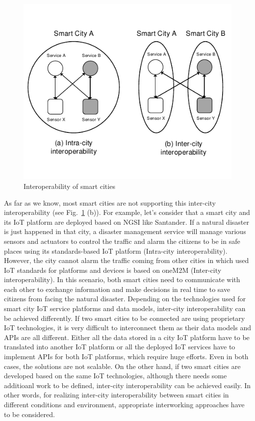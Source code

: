 \begin{figure}[H] %
\centering
\includegraphics[width=\textwidth]{figures/fig_interoperabilities_of_smart_cities.pdf}
\caption{Interoperability of smart cities}
\label{fig:definition_of_smartcity_interop}
\end{figure}

As far as we know, most smart cities are not supporting this inter-city interoperability (see Fig.~\ref{fig:definition_of_smartcity_interop} (b)). For example, let’s consider that a smart city and its IoT platform are deployed based on NGSI like Santander. If a natural disaster is just happened in that city, a disaster management service will manage various sensors and actuators to control the traffic and alarm the citizens to be in safe places using its standards-based IoT platform (Intra-city interoperability). However, the city cannot alarm the traffic coming from other cities in which used IoT standards for platforms and devices is based on oneM2M (Inter-city interoperability). In this scenario, both smart cities need to communicate with each other to exchange information and make decisions in real time to save citizens from facing the natural disaster. Depending on the technologies used for smart city IoT service platforms and data models, inter-city interoperability can be achieved differently. If two smart cities to be connected are using proprietary IoT technologies, it is very difficult to interconnect them as their data models and APIs are all different. Either all the data stored in a city IoT platform
have to be translated into another IoT platform or all the deployed IoT services have to implement APIs for both IoT
platforms, which require huge efforts. Even in both cases, the solutions are not scalable. On the other hand, if two smart cities are developed based on the same IoT technologies, although there needs some additioanl work to be defined, inter-city interoperability can be achieved easily. In other words, for realizing inter-city interoperability between smart cities in different conditions and environment, appropriate interworking approaches have to be considered.

